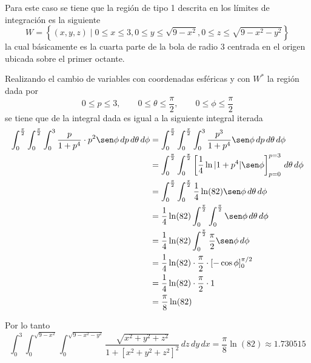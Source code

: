 Para este caso se tiene que la región de tipo 1 descrita en los límites de integración es la siguiente
\[W = \left\{(x, y, z) \mid 0 \leq x \leq 3, 0 \leq y \leq \sqrt{9 - x^2}, 0 \leq z \leq \sqrt{9 - x^2 - y^2}\right\}\]
la cual básicamente es la cuarta parte de la bola de radio 3 centrada en el origen ubicada sobre el primer octante.

Realizando el cambio de variables con coordenadas esféricas y con $W^*$ la región dada por
\[0 \leq p \leq 3, \qquad 0 \leq \theta \leq \frac{\pi}{2}, \qquad 0 \leq \phi \leq \frac{\pi}{2}\]
se tiene que de la integral dada es igual a la siguiente integral iterada
\begin{align*}
	\int_0^{\frac{\pi}{2}} \int_0^{\frac{\pi}{2}} \int_0^3 \frac{p}{1 + p^4} \cdot p^2 \sen\phi\, dp\, d\theta\, d\phi
	&= \int_0^{\frac{\pi}{2}} \int_0^{\frac{\pi}{2}} \int_0^3 \frac{p^3}{1 + p^4} \sen\phi\, dp\, d\theta\, d\phi\\
	&= \int_0^{\frac{\pi}{2}} \int_0^{\frac{\pi}{2}} \left[\frac{1}{4} \ln|1+p^4| \sen\phi\right]_{p=0}^{p=3}\, d\theta\, d\phi\\
	&= \int_0^{\frac{\pi}{2}} \int_0^{\frac{\pi}{2}} \frac{1}{4} \ln(82) \sen\phi\, d\theta\, d\phi\\
	&= \frac{1}{4} \ln(82) \int_0^{\frac{\pi}{2}} \int_0^{\frac{\pi}{2}} \sen\phi\, d\theta\, d\phi\\
	&= \frac{1}{4} \ln(82) \int_0^{\frac{\pi}{2}} \frac{\pi}{2} \sen\phi \, d\phi\\
	&= \frac{1}{4} \ln(82) \cdot \frac{\pi}{2} \cdot [-\cos\phi]_0^{\pi/2}\\
	&= \frac{1}{4} \ln(82) \cdot \frac{\pi}{2} \cdot 1\\
	&= \frac{\pi}{8} \ln(82)
\end{align*}

Por lo tanto
\[\int_0^3 \int_0^{\sqrt{9 - x^2}} \int_0^{\sqrt{9 - x^2 - y^2}} \frac{\sqrt{x^2 + y^2 + z^2}}{1 + [x^2 + y^2 + z^2]^2}\, dz\, dy\, dx = \frac{\pi}{8} \ln(82) \approx 1.730515\]
